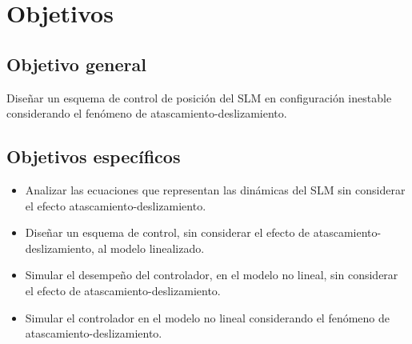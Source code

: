 \chapter{Objetivos}\label{chap:objetivos}

\section{Objetivo general}
Diseñar un esquema de control de posición del SLM en configuración inestable considerando el fenómeno de atascamiento-deslizamiento.

\section{Objetivos específicos}
\begin{itemize}
	\item Analizar las ecuaciones que representan las dinámicas del SLM sin considerar el efecto atascamiento-deslizamiento. 
	\item Diseñar un esquema de control, sin considerar el efecto de atascamiento-deslizamiento, al modelo linealizado.
	\item Simular el desempeño del controlador, en el modelo no lineal, sin considerar el efecto de atascamiento-deslizamiento.
	\item Simular el controlador en el modelo no lineal considerando el fenómeno de atascamiento-deslizamiento.
\end{itemize}